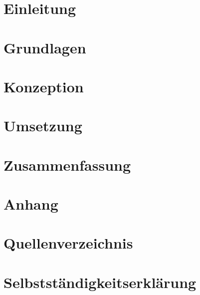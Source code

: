 \documentclass[a4paper, 12pt]{article}
\begin{document}
\sloppy

\newpage
{}
\tableofcontents
\newpage
\listoffigures
{}
\renewcommand{\lstlistlistingname}{Quellcodeverzeichnis}
\lstlistoflistings
{}
\newpage
\clearpage 
{}   

\section{Einleitung}
\label{sec:Einleitung}

\newpage
\section{Grundlagen}
\label{sec:Grundlagen}

\newpage
\section{Konzeption}
\label{sec:Konzeption}

\newpage
\section{Umsetzung}
\label{sec:Umsetzung}

\newpage
\section{Zusammenfassung}
\label{sec:Zusammenfassung}

\newpage
\section{Anhang}
\label{sec:Anhang}

\newpage
\section{Quellenverzeichnis}
\printbibliography[title={ }]
\newpage
\section*{Selbstständigkeitserklärung}

\end{document}

